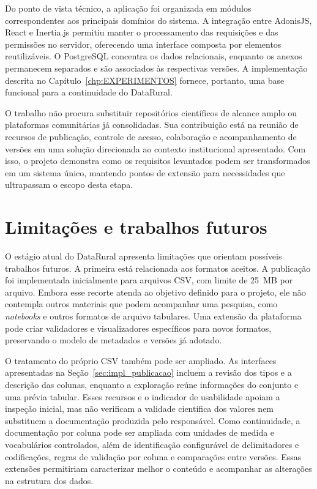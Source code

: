 Do ponto de vista técnico, a aplicação foi organizada em módulos correspondentes aos principais domínios do sistema. A integração entre AdonisJS, React e Inertia.js permitiu manter o processamento das requisições e das permissões no servidor, oferecendo uma interface composta por elementos reutilizáveis. O PostgreSQL concentra os dados relacionais, enquanto os anexos permanecem separados e são associados às respectivas versões. A implementação descrita no Capítulo~\ref{chp:EXPERIMENTOS} fornece, portanto, uma base funcional para a continuidade do DataRural.

O trabalho não procura substituir repositórios científicos de alcance amplo ou plataformas comunitárias já consolidadas. Sua contribuição está na reunião de recursos de publicação, controle de acesso, colaboração e acompanhamento de versões em uma solução direcionada ao contexto institucional apresentado. Com isso, o projeto demonstra como os requisitos levantados podem ser transformados em um sistema único, mantendo pontos de extensão para necessidades que ultrapassam o escopo desta etapa.

\section{Limitações e trabalhos futuros}

O estágio atual do DataRural apresenta limitações que orientam possíveis trabalhos futuros. A primeira está relacionada aos formatos aceitos. A publicação foi implementada inicialmente para arquivos CSV, com limite de 25~MB por arquivo. Embora esse recorte atenda ao objetivo definido para o projeto, ele não contempla outros materiais que podem acompanhar uma pesquisa, como \textit{notebooks} e outros formatos de arquivo tabulares. Uma extensão da plataforma pode criar validadores e visualizadores específicos para novos formatos, preservando o modelo de metadados e versões já adotado.

O tratamento do próprio CSV também pode ser ampliado. As interfaces apresentadas na Seção~\ref{sec:impl_publicacao} incluem a revisão dos tipos e a descrição das colunas, enquanto a exploração reúne informações do conjunto e uma prévia tabular. Esses recursos e o indicador de usabilidade apoiam a inspeção inicial, mas não verificam a validade científica dos valores nem substituem a documentação produzida pelo responsável. Como continuidade, a documentação por coluna pode ser ampliada com unidades de medida e vocabulários controlados, além de identificação configurável de delimitadores e codificações, regras de validação por coluna e comparações entre versões. Essas extensões permitiriam caracterizar melhor o conteúdo e acompanhar as alterações na estrutura dos dados.

